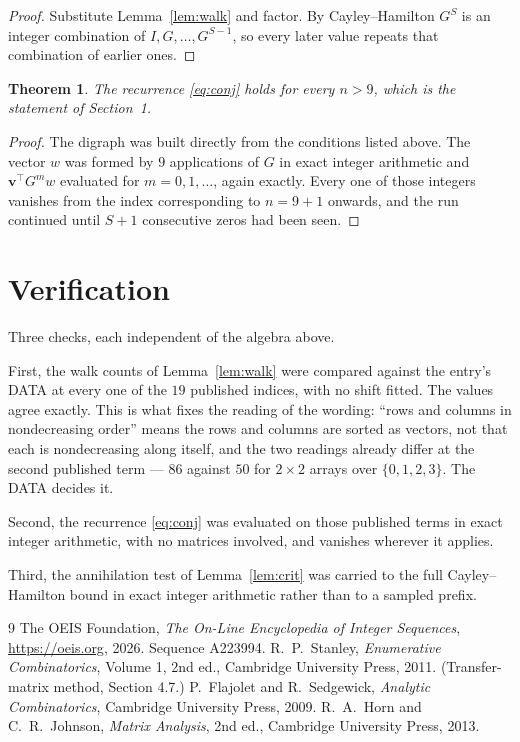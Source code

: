 \documentclass[11pt,a4paper]{article}
\theoremstyle{plain}
\newtheorem{theorem}{Theorem}
\theoremstyle{definition}
\begin{document}
\begin{proof}
Substitute Lemma~\ref{lem:walk} and factor. By Cayley--Hamilton $G^{S}$ is an integer
combination of $I,G,\dots,G^{S-1}$, so every later value repeats that combination of
earlier ones.
\end{proof}

\begin{theorem}
The recurrence \eqref{eq:conj} holds for every $n>9$, which is the statement of
Section~1.
\end{theorem}

\begin{proof}
The digraph was built directly from the conditions listed above. The vector $w$ was formed by
$9$ applications of $G$ in exact integer arithmetic and $\mathbf{v}^{\!\top}G^{m}w$
evaluated for $m=0,1,\dots$, again exactly. Every one of those integers vanishes from the
index corresponding to $n=9+1$ onwards, and the run continued until $S+1$ consecutive
zeros had been seen.
\end{proof}

\section{Verification}

Three checks, each independent of the algebra above.

First, the walk counts of Lemma~\ref{lem:walk} were compared against the entry's DATA at
every one of the $19$ published indices, with no shift fitted. The values agree exactly.
This is what fixes the reading of the wording: ``rows and columns in nondecreasing order''
means the rows and columns are sorted as vectors, not that each is nondecreasing along
itself, and the two readings already differ at the second published term --- $86$ against
$50$ for $2\times2$ arrays over $\{0,1,2,3\}$. The DATA decides it.

Second, the recurrence \eqref{eq:conj} was evaluated on those published terms in exact
integer arithmetic, with no matrices involved, and vanishes wherever it applies.

Third, the annihilation test of Lemma~\ref{lem:crit} was carried to the full
Cayley--Hamilton bound in exact integer arithmetic rather than to a sampled prefix.

\begin{thebibliography}{9}
 The OEIS Foundation, \emph{The On-Line Encyclopedia of Integer
Sequences}, \url{https://oeis.org}, 2026. Sequence A223994.
 R.~P.~Stanley, \emph{Enumerative Combinatorics}, Volume 1, 2nd ed.,
Cambridge University Press, 2011. (Transfer-matrix method, Section 4.7.)
 P.~Flajolet and R.~Sedgewick, \emph{Analytic Combinatorics}, Cambridge
University Press, 2009.
 R.~A.~Horn and C.~R.~Johnson, \emph{Matrix Analysis}, 2nd ed., Cambridge
University Press, 2013.
\end{thebibliography}
\end{document}
